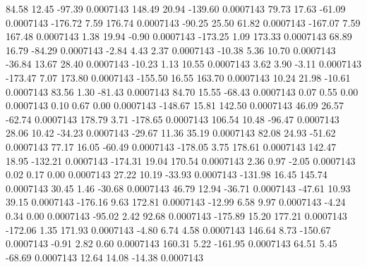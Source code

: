        84.58       12.45      -97.39     0.0007143
      148.49       20.94     -139.60     0.0007143
       79.73       17.63      -61.09     0.0007143
     -176.72        7.59      176.74     0.0007143
      -90.25       25.50       61.82     0.0007143
     -167.07        7.59      167.48     0.0007143
        1.38       19.94       -0.90     0.0007143
     -173.25        1.09      173.33     0.0007143
       68.89       16.79      -84.29     0.0007143
       -2.84        4.43        2.37     0.0007143
      -10.38        5.36       10.70     0.0007143
      -36.84       13.67       28.40     0.0007143
      -10.23        1.13       10.55     0.0007143
        3.62        3.90       -3.11     0.0007143
     -173.47        7.07      173.80     0.0007143
     -155.50       16.55      163.70     0.0007143
       10.24       21.98      -10.61     0.0007143
       83.56        1.30      -81.43     0.0007143
       84.70       15.55      -68.43     0.0007143
        0.07        0.55        0.00     0.0007143
        0.10        0.67        0.00     0.0007143
     -148.67       15.81      142.50     0.0007143
       46.09       26.57      -62.74     0.0007143
      178.79        3.71     -178.65     0.0007143
      106.54       10.48      -96.47     0.0007143
       28.06       10.42      -34.23     0.0007143
      -29.67       11.36       35.19     0.0007143
       82.08       24.93      -51.62     0.0007143
       77.17       16.05      -60.49     0.0007143
     -178.05        3.75      178.61     0.0007143
      142.47       18.95     -132.21     0.0007143
     -174.31       19.04      170.54     0.0007143
        2.36        0.97       -2.05     0.0007143
        0.02        0.17        0.00     0.0007143
       27.22       10.19      -33.93     0.0007143
     -131.98       16.45      145.74     0.0007143
       30.45        1.46      -30.68     0.0007143
       46.79       12.94      -36.71     0.0007143
      -47.61       10.93       39.15     0.0007143
     -176.16        9.63      172.81     0.0007143
      -12.99        6.58        9.97     0.0007143
       -4.24        0.34        0.00     0.0007143
      -95.02        2.42       92.68     0.0007143
     -175.89       15.20      177.21     0.0007143
     -172.06        1.35      171.93     0.0007143
       -4.80        6.74        4.58     0.0007143
      146.64        8.73     -150.67     0.0007143
       -0.91        2.82        0.60     0.0007143
      160.31        5.22     -161.95     0.0007143
       64.51        5.45      -68.69     0.0007143
       12.64       14.08      -14.38     0.0007143
